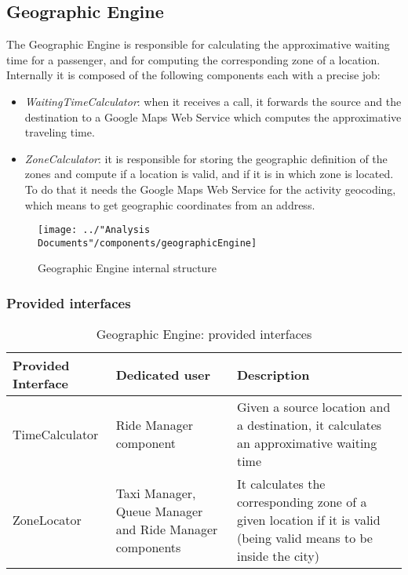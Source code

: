 \subsection{Geographic Engine}\label{comp:geographicEngine}
The Geographic Engine is responsible for calculating the approximative waiting time for a passenger, and for computing the corresponding zone of a location. Internally it is composed of the following components each with a precise job:
\begin{itemize}
	\item \textit{WaitingTimeCalculator}: when it receives a call, it forwards the source and the destination to a Google Maps Web Service which computes the approximative traveling time.
	\item \textit{ZoneCalculator}: it is responsible for storing the geographic definition of the zones and compute if a location is valid, and if it is in which zone is located. To do that it needs the Google Maps Web Service for the activity geocoding, which means to get geographic coordinates from an address.
\end{itemize}
\begin{figure}[H]
	\centering
	\texttt{[image: ../"Analysis Documents"/components/geographicEngine]}
	\label{fig:geographicengine}
	\caption{Geographic Engine internal structure}
\end{figure}
\subsubsection{Provided interfaces}
\begin{table}[H]
	\begin{longtable}{| p{} | p{} | p{} |}
		\hline
		\textbf{Provided Interface} & \textbf{Dedicated user} & \textbf{Description} \\ \hline
		TimeCalculator & Ride Manager component & Given a source location and a destination, it calculates an approximative waiting time \\ \hline
		ZoneLocator & Taxi Manager, Queue Manager and Ride Manager components & It calculates the corresponding zone of a given location if it is valid (being valid means to be inside the city) \\ \hline
	\end{longtable}
	\caption{Geographic Engine: provided interfaces}
	\label{tab:geographicengine:providedInterfaces}
\end{table}
